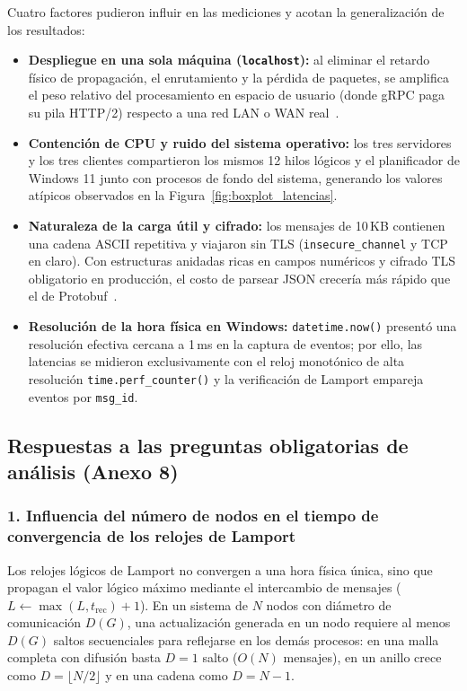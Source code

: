 Cuatro factores pudieron influir en las mediciones y acotan la generalización de los resultados:
\begin{itemize}
  \item \textbf{Despliegue en una sola máquina (\texttt{localhost}):} al eliminar el retardo físico de propagación, el enrutamiento y la pérdida de paquetes, se amplifica el peso relativo del procesamiento en espacio de usuario (donde gRPC paga su pila HTTP/2) respecto a una red LAN o WAN real~\cite{ciftci2025review}.
  \item \textbf{Contención de CPU y ruido del sistema operativo:} los tres servidores y los tres clientes compartieron los mismos 12 hilos lógicos y el planificador de Windows 11 junto con procesos de fondo del sistema, generando los valores atípicos observados en la Figura~\ref{fig:boxplot_latencias}.
  \item \textbf{Naturaleza de la carga útil y cifrado:} los mensajes de 10\,KB contienen una cadena ASCII repetitiva y viajaron sin TLS (\texttt{insecure\_channel} y TCP en claro). Con estructuras anidadas ricas en campos numéricos y cifrado TLS obligatorio en producción, el costo de parsear JSON crecería más rápido que el de Protobuf~\cite{mehdi2026crosslanguage,haindl2024security}.
  \item \textbf{Resolución de la hora física en Windows:} \texttt{datetime.now()} presentó una resolución efectiva cercana a 1\,ms en la captura de eventos; por ello, las latencias se midieron exclusivamente con el reloj monotónico de alta resolución \texttt{time.perf\_counter()} y la verificación de Lamport empareja eventos por \texttt{msg\_id}.
\end{itemize}

\subsection{Respuestas a las preguntas obligatorias de análisis (Anexo 8)}

\subsubsection{1. Influencia del número de nodos en el tiempo de convergencia de los relojes de Lamport}

Los relojes lógicos de Lamport no convergen a una hora física única, sino que propagan el valor lógico máximo mediante el intercambio de mensajes ($L \leftarrow \operatorname{max}(L, t_{\mathrm{rec}}) + 1$). En un sistema de $N$ nodos con diámetro de comunicación $D(G)$, una actualización generada en un nodo requiere al menos $D(G)$ saltos secuenciales para reflejarse en los demás procesos: en una malla completa con difusión basta $D = 1$ salto ($O(N)$ mensajes), en un anillo crece como $D = \lfloor N/2 \rfloor$ y en una cadena como $D = N - 1$.

